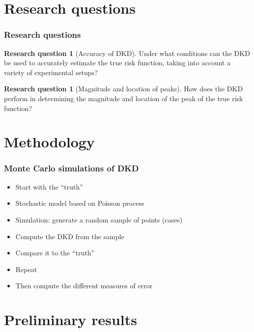 \documentclass{beamer}
\theoremstyle{definition}
\newtheorem{researchquestion}[theorem]{Research question}
\begin{document}
\section{Research questions}

\begin{frame}\frametitle{Research questions}
    \begin{researchquestion}[Accuracy of DKD]
        Under what conditions can the DKD be used to accurately estimate the true risk function, taking into account a variety of experimental setups?
    \end{researchquestion}
    \begin{researchquestion}[Magnitude and location of peaks]
        How does the DKD perform in determining the magnitude and location of the peak of the true risk function?
    \end{researchquestion}
\end{frame}

\section{Methodology}

\begin{frame}\frametitle{Monte Carlo simulations of DKD}
    \begin{itemize}
        \item Start with the ``truth''
        \item Stochastic model based on Poisson process
        \item Simulation: generate a random sample of points (cases)
        \item Compute the DKD from the sample
        \item Compare it to the ``truth''
        \item Repeat \textellipsis
        \item Then compute the different measures of error
    \end{itemize}
\end{frame}

\section{Preliminary results}

\end{document}
